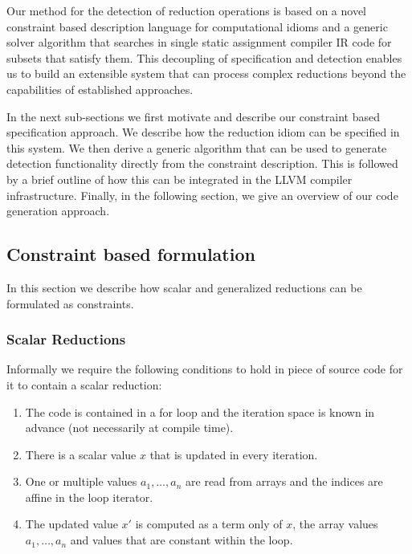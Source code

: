 Our method for the detection of reduction operations is based on a novel constraint based description language for computational idioms and a generic solver algorithm that searches in single static assignment compiler IR code for subsets that satisfy them.
This decoupling of specification and detection enables us to build an extensible system that can process complex reductions beyond the capabilities of established approaches.

In the next sub-sections we first motivate and describe our constraint based specification approach.
We describe how the reduction idiom can be specified in this system.
We then derive a generic algorithm that can be used to generate detection functionality directly from the constraint description.
This is followed by a brief outline of how this can be integrated in the LLVM compiler infrastructure.
Finally, in the following section,  we give an overview of our code generation   approach.

\subsection{Constraint based formulation}
In this section we describe how scalar and generalized reductions can be formulated as constraints.
\subsubsection{Scalar Reductions}
Informally  we require the following conditions to hold in piece of source code for it to contain a scalar reduction:
\begin{enumerate}
\item The code is contained in a for loop and the iteration space is known in advance (not necessarily at compile time).
\item There is a scalar value $x$ that is updated in every iteration.
\item One or multiple values $a_1,\dots,a_n$ are read from arrays and the indices are affine in the loop iterator.
\item The updated value $x'$ is computed as a term only of $x$, the array values $a_1,\dots,a_n$ and values that are constant within the loop.
\end{enumerate}

